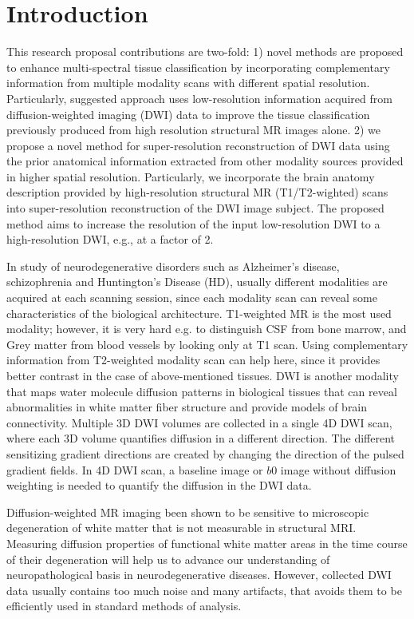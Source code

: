 
\section{Introduction}
\label{Introduction}

This research proposal contributions are two-fold:
1) novel methods are proposed to enhance multi-spectral tissue classification by incorporating complementary information from multiple modality scans with different spatial resolution.
Particularly, suggested approach uses low-resolution information acquired from diffusion-weighted imaging (DWI) data to improve the tissue classification previously produced from high resolution structural MR images alone.
2) we propose a novel method for super-resolution reconstruction of DWI data using the prior anatomical information extracted from other modality sources provided in higher spatial resolution.  Particularly, we incorporate the brain anatomy description provided by high-resolution structural MR (T1/T2-wighted) scans into super-resolution reconstruction of the DWI image subject. The proposed method aims to increase the resolution of the input low-resolution DWI to a high-resolution DWI, e.g., at a factor of 2.
\newline

\noindent 
In study of neurodegenerative disorders such as Alzheimer's disease, schizophrenia and Huntington's Disease (HD), usually different modalities are acquired at each scanning session, since each modality scan can reveal some characteristics of the biological architecture. T1-weighted MR is the most used modality; however, it is very hard e.g. to distinguish CSF from bone marrow, and Grey matter from blood vessels by looking only at T1 scan. Using complementary information from T2-weighted modality scan can help here, since it provides better contrast in the case of above-mentioned tissues.
DWI is another modality that maps water molecule diffusion patterns in biological tissues that can reveal abnormalities in white matter fiber structure and provide models of brain connectivity. Multiple 3D DWI volumes are collected in a single 4D DWI scan, where each 3D volume quantifies diffusion in a different direction. The different sensitizing gradient directions are created by changing the direction of the pulsed gradient fields. In 4D DWI scan, a baseline image or $b0$ image without diffusion weighting is needed to quantify the diffusion in the DWI data. 
\newline

\noindent 
Diffusion-weighted MR imaging been shown to be sensitive to microscopic degeneration of white matter that is not measurable in structural MRI. Measuring diffusion properties of functional white matter areas in the time course of their degeneration will help us to advance our understanding of neuropathological basis in neurodegenerative diseases.
However, collected DWI data usually contains too much noise and many artifacts, that avoids them to be efficiently used in standard methods of analysis.
\newline

